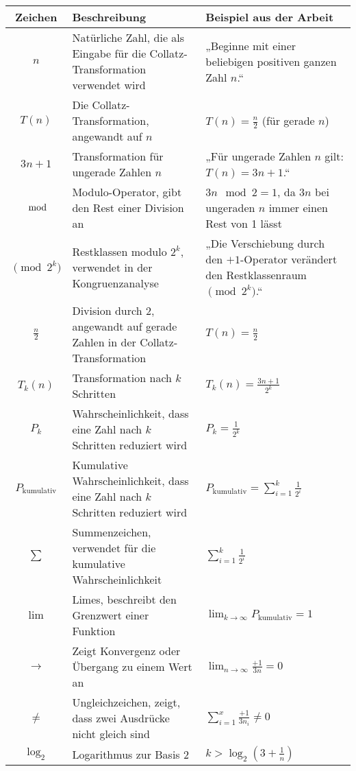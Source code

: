 \documentclass[a4paper,12pt]{article}
\begin{document}
\begin{table}[h!]
\centering
\begin{tabular}{|c|p{7cm}|p{5cm}|}
\hline
\textbf{Zeichen} & \textbf{Beschreibung} & \textbf{Beispiel aus der Arbeit} \\ \hline
\( n \) & Natürliche Zahl, die als Eingabe für die Collatz-Transformation verwendet wird & „Beginne mit einer beliebigen positiven ganzen Zahl \( n \).“ \\ \hline
\( T(n) \) & Die Collatz-Transformation, angewandt auf \( n \) & \( T(n) = \frac{n}{2} \) (für gerade \( n \)) \\ \hline
\( 3n + 1 \) & Transformation für ungerade Zahlen \( n \) & „Für ungerade Zahlen \( n \) gilt: \( T(n) = 3n + 1 \).“ \\ \hline
\( \mod \) & Modulo-Operator, gibt den Rest einer Division an & \( 3n \mod 2 = 1 \), da \( 3n \) bei ungeraden \( n \) immer einen Rest von 1 lässt \\ \hline
\( \pmod{2^k} \) & Restklassen modulo \( 2^k \), verwendet in der Kongruenzanalyse & „Die Verschiebung durch den \(+1\)-Operator verändert den Restklassenraum \( \pmod{2^k} \).“ \\ \hline
\( \frac{n}{2} \) & Division durch 2, angewandt auf gerade Zahlen in der Collatz-Transformation & \( T(n) = \frac{n}{2} \) \\ \hline
\( T_k(n) \) & Transformation nach \( k \) Schritten & \( T_k(n) = \frac{3n + 1}{2^k} \) \\ \hline
\( P_k \) & Wahrscheinlichkeit, dass eine Zahl nach \( k \) Schritten reduziert wird & \( P_k = \frac{1}{2^k} \) \\ \hline
\( P_{\text{kumulativ}} \) & Kumulative Wahrscheinlichkeit, dass eine Zahl nach \( k \) Schritten reduziert wird & \( P_{\text{kumulativ}} = \sum_{i=1}^k \frac{1}{2^i} \) \\ \hline
\( \sum \) & Summenzeichen, verwendet für die kumulative Wahrscheinlichkeit & \( \sum_{i=1}^k \frac{1}{2^i} \) \\ \hline
\( \lim \) & Limes, beschreibt den Grenzwert einer Funktion & \( \lim_{k \to \infty} P_{\text{kumulativ}} = 1 \) \\ \hline
\( \to \) & Zeigt Konvergenz oder Übergang zu einem Wert an & \( \lim_{n \to \infty} \frac{+1}{3n} = 0 \) \\ \hline
\( \neq \) & Ungleichzeichen, zeigt, dass zwei Ausdrücke nicht gleich sind & \( \sum_{i=1}^x \frac{+1}{3n_i} \neq 0 \) \\ \hline
\( \log_2 \) & Logarithmus zur Basis 2 & \( k > \log_2(3 + \frac{1}{n}) \) \\ \hline

\end{tabular}
\end{table}
\end{document}
